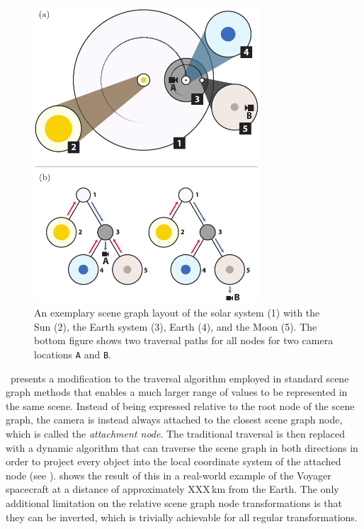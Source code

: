 \begin{figure}
\centering
\includegraphics[width=0.75\textwidth]{figures/contributions/dsg/scenegraph.pdf}
\caption{An exemplary scene graph layout of the solar system (1) with the Sun (2), the Earth system (3), Earth (4), and the Moon (5). The bottom figure shows two traversal paths for all nodes for two camera locations \texttt{A} and \texttt{B}.}
\label{contributions:astro:dsg:scenegraph}
\end{figure}

\paperDSG\ presents a modification to the traversal algorithm employed in standard scene graph methods that enables a much larger range of values to be represented in the same scene.  Instead of being expressed relative to the root node of the scene graph, the camera is instead always attached to the closest scene graph node, which is called the \emph{attachment node}.  The traditional traversal is then replaced with a dynamic algorithm that can traverse the scene graph in both directions in order to project every object into the local coordinate system of the attached node (see ).   shows the result of this in a real-world example of the Voyager spacecraft at a distance of approximately XXX\,km from the Earth.  The only additional limitation on the relative scene graph node transformations is that they can be inverted, which is trivially achievable for all regular transformations.

